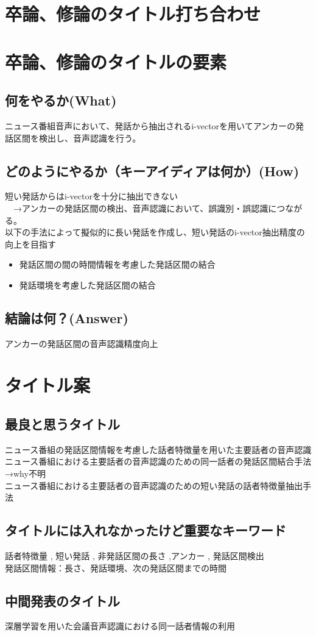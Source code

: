 \documentclass[11pt,a4paper]{jsarticle}
\begin{document}
%
%
\section*{卒論、修論のタイトル打ち合わせ}
\section{卒論、修論のタイトルの要素}
\subsection{何をやるか(What)}
ニュース番組音声において、発話から抽出されるi-vectorを用いてアンカーの発話区間を検出し、音声認識を行う。

\subsection{どのようにやるか（キーアイディアは何か）(How)}
短い発話からはi-vectorを十分に抽出できない\\
　→アンカーの発話区間の検出、音声認識において、誤識別・誤認識につながる。\\

以下の手法によって擬似的に長い発話を作成し、短い発話のi-vector抽出精度の向上を目指す

\begin{itemize}
\item 発話区間の間の時間情報を考慮した発話区間の結合
\item 発話環境を考慮した発話区間の結合
\end{itemize}

\subsection{結論は何？(Answer)}
アンカーの発話区間の音声認識精度向上

\section{タイトル案}

\subsection{最良と思うタイトル}
ニュース番組の発話区間情報を考慮した話者特徴量を用いた主要話者の音声認識\\
ニュース番組における主要話者の音声認識のための同一話者の発話区間結合手法→why不明\\
ニュース番組における主要話者の音声認識のための短い発話の話者特徴量抽出手法

\subsection{タイトルには入れなかったけど重要なキーワード}
話者特徴量 , 短い発話 , 非発話区間の長さ ,アンカー , 発話区間検出\\

発話区間情報：長さ、発話環境、次の発話区間までの時間

\subsection{中間発表のタイトル}
深層学習を用いた会議音声認識における同一話者情報の利用


%
%
\end{document}
